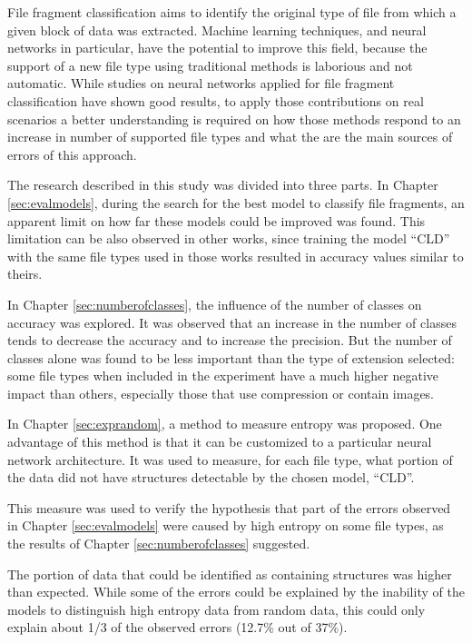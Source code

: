 
File fragment classification aims to identify the original type of file from which a given block of data was extracted. Machine learning techniques, and neural networks in particular, have the potential to improve this field, because the support of a new file type using traditional methods is laborious and not automatic. While studies on neural networks applied for file fragment classification have shown good results, to apply those contributions on real scenarios a better understanding is required on how those methods respond to an increase in number of supported file types and what the are the main sources of errors of this approach.

The research described in this study was divided into three parts.
In Chapter \ref{sec:evalmodels}, during the search for the best model to classify file fragments, an apparent limit on how far these models could be improved was found. This limitation can be also observed in other works, since training the model ``CLD'' with the same file types used in those works resulted in accuracy values similar to theirs.

In Chapter \ref{sec:numberofclasses}, the influence of the number of classes on accuracy was explored. It was observed that an increase in the number of classes tends to decrease the accuracy and to increase the precision. But the number of classes alone was found to be less important than the type of extension selected: some file types when included in the experiment have a much higher negative impact than others, especially those that use compression or contain images.

In Chapter \ref{sec:exprandom}, a method to measure entropy was proposed. One advantage of this method is that it can be customized to a particular neural network architecture. It was used to measure, for each file type, what portion of the data did not have structures detectable by the chosen model, ``CLD''.

This measure was used to verify the hypothesis that part of the errors observed in Chapter \ref{sec:evalmodels} were caused by high entropy on some file types, as the results of Chapter  \ref{sec:numberofclasses} suggested.

The portion of data that could be identified as containing structures was higher than expected. While some of the errors could be explained by the inability of the models to distinguish  high entropy data from random data, this could only explain about 1/3 of the observed errors (12.7\% out of 37\%).

